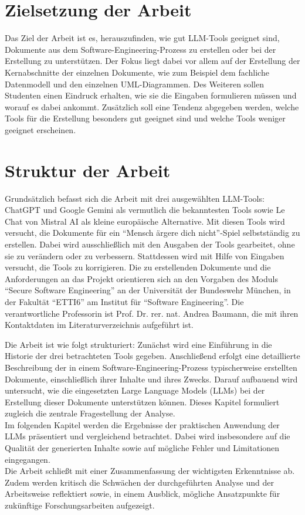 \section{Zielsetzung der Arbeit}  \label{Zielsetzung der Arbeit}

Das Ziel der Arbeit ist es, herauszufinden, wie gut LLM-Tools geeignet sind, Dokumente aus dem Software-Engineering-Prozess zu 
erstellen oder bei der Erstellung zu unterstützen. Der Fokus liegt dabei vor allem auf der Erstellung der Kernabschnitte der 
einzelnen Dokumente, wie zum Beispiel dem fachliche Datenmodell und den einzelnen UML-Diagrammen. Des Weiteren sollen Studenten 
einen Eindruck erhalten, wie sie die Eingaben formulieren müssen und worauf es dabei ankommt. Zusätzlich soll eine Tendenz 
abgegeben werden, welche Tools für die Erstellung besonders gut geeignet sind und welche Tools weniger geeignet erscheinen. 

\section{Struktur der Arbeit}  \label{Struktur der Arbeit}

Grundsätzlich befasst sich die Arbeit mit drei ausgewählten LLM-Tools: ChatGPT und Google Gemini als vermutlich die 
bekanntesten Tools sowie Le Chat von Mistral AI als kleine europäische Alternative. Mit diesen Tools wird versucht, 
die Dokumente für ein ``Mensch ärgere dich nicht''-Spiel selbstständig zu erstellen. Dabei wird ausschließlich mit den 
Ausgaben der Tools gearbeitet, ohne sie zu verändern oder zu verbessern. Stattdessen wird mit Hilfe von Eingaben 
versucht, die Tools zu korrigieren. Die zu erstellenden Dokumente und die Anforderungen an das Projekt orientieren 
sich an den Vorgaben des Moduls ``Secure Software Engineering'' an der Universität der Bundeswehr München, in der 
Fakultät ``ETTI6'' am Institut für ``Software Engineering''. Die verantwortliche Professorin ist Prof. Dr. rer. nat. Andrea Baumann, 
die mit ihren Kontaktdaten im Literaturverzeichnis aufgeführt ist.

Die Arbeit ist wie folgt strukturiert: Zunächst wird eine Einführung in die Historie der drei betrachteten Tools gegeben. 
Anschließend erfolgt eine detaillierte Beschreibung der in einem Software-Engineering-Prozess typischerweise erstellten 
Dokumente, einschließlich ihrer Inhalte und ihres Zwecks. Darauf aufbauend wird untersucht, wie die eingesetzten Large 
Language Models (LLMs) bei der Erstellung dieser Dokumente unterstützen können. Dieses Kapitel formuliert zugleich die 
zentrale Fragestellung der Analyse.\\
Im folgenden Kapitel werden die Ergebnisse der praktischen Anwendung der LLMs präsentiert und vergleichend betrachtet. 
Dabei wird insbesondere auf die Qualität der generierten Inhalte sowie auf mögliche Fehler und Limitationen eingegangen.\\
Die Arbeit schließt mit einer Zusammenfassung der wichtigsten Erkenntnisse ab. Zudem werden kritisch die Schwächen der 
durchgeführten Analyse und der Arbeitsweise reflektiert sowie, in einem Ausblick, mögliche Ansatzpunkte für zukünftige Forschungsarbeiten aufgezeigt.

